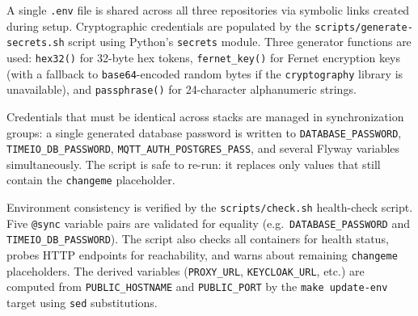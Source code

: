 A single \texttt{.env} file is shared across all three repositories via symbolic links
created during setup. Cryptographic credentials are populated by the \texttt{scripts/generate-secrets.sh} script using Python's \texttt{secrets} module. Three generator functions
are used: \texttt{hex32()} for 32-byte hex tokens, \texttt{fernet\_key()} for Fernet
encryption keys (with a fallback to \texttt{base64}-encoded random bytes if the
\texttt{cryptography} library is unavailable), and \texttt{passphrase()} for 24-character
alphanumeric strings.

Credentials that must be identical across stacks are managed in synchronization groups: a
single generated database password is written to \texttt{DATABASE\_PASSWORD},
\texttt{TIMEIO\_DB\_PASSWORD}, \texttt{MQTT\_AUTH\_POSTGRES\_PASS}, and several Flyway
variables simultaneously. The script is safe to re-run: it replaces only values that still
contain the \texttt{changeme} placeholder.

Environment consistency is verified by the \texttt{scripts/check.sh} health-check script.
Five \texttt{@sync} variable pairs are validated for equality (e.g.\
\texttt{DATABASE\_PASSWORD} and \texttt{TIMEIO\_DB\_PASSWORD}). The script also checks all
containers for health status, probes HTTP endpoints for reachability, and warns about
remaining \texttt{changeme} placeholders. The derived variables (\texttt{PROXY\_URL},
\texttt{KEYCLOAK\_URL}, etc.) are computed from \texttt{PUBLIC\_HOSTNAME} and
\texttt{PUBLIC\_PORT} by the \texttt{make update-env} target using \texttt{sed}
substitutions.
